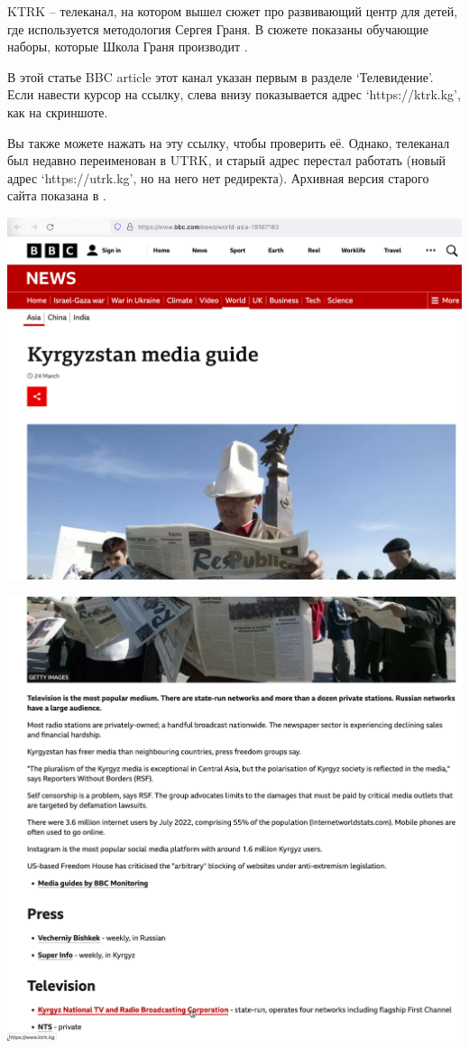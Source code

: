 
KTRK -- телеканал, на котором вышел сюжет про развивающий центр для детей,
где используется методология Сергея Граня.
В сюжете показаны обучающие наборы, которые Школа Граня производит .

В этой статье BBC article этот канал указан первым в разделе `Телевидение'.
Если навести курсор на ссылку, слева внизу показывается адрес `https://ktrk.kg',
как на скриншоте.

Вы также можете нажать на эту ссылку, чтобы проверить её. Однако, телеканал был недавно переименован
в UTRK, и старый адрес перестал работать
(новый адрес `https://utrk.kg', но на него нет редиректа).
Архивная версия старого сайта показана в .

\begin{center}
    \includegraphics[width=40em]{bbc-utrk-p1}
\end{center}
\WillContinue
\pagebreak

\Continuing
\begin{center}
    \includegraphics[width=40em]{bbc-utrk-p2}
\end{center}

\pagebreak
